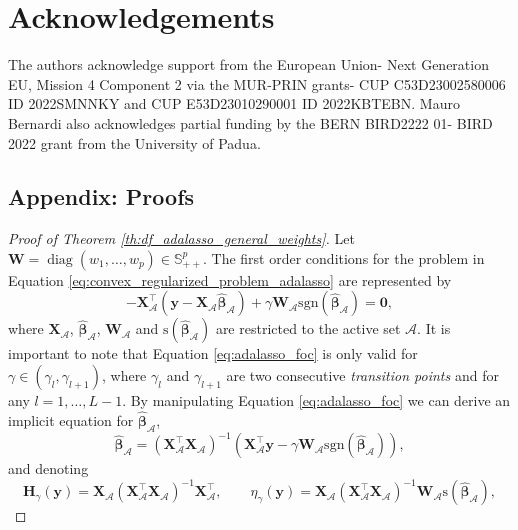 \documentclass[a4paper, 12pt]{article}
\newcommand{\Aset}{\mathcal{A}}
\newcommand{\sgn}{\mathrm{s}}
\DeclareMathOperator{\diag}{diag}
\newcommand{\T}{\top}
\def\bbeta{\boldsymbol{\beta}}
\def\by{\boldsymbol{y}}
\def\bH{\mathbf{H}}
\def\bW{\mathbf{W}}
\def\bX{\mathbf{X}}
\def\by{\mathbf{y}}
\begin{document}
\bigskip 

\section*{Acknowledgements}
The authors acknowledge support from the European Union- Next Generation EU, Mission 4 Component 2 via the MUR-PRIN grants- CUP C53D23002580006 ID 2022SMNNKY and CUP E53D23010290001 ID 2022KBTEBN. Mauro Bernardi also acknowledges partial funding by the BERN BIRD2222 01- BIRD 2022 grant from the University of Padua.

\begin{appendix}
\section*{Appendix: Proofs}
\label{sec:proofs}
%
\begin{proof}[Proof of Theorem \ref{th:df_adalasso_general_weights}]
Let $\bW=\diag(w_1,\dots,w_p)\in\mathbb{S}^p_{++}$. The first order conditions for the problem in Equation \eqref{eq:convex_regularized_problem_adalasso} are represented by
\begin{equation}
\label{eq:adalasso_foc}
-\bX_{\Aset}^{{\T}}(\by-\bX_{\Aset} \widehat{\bbeta}_{\Aset})+\gamma\bW_{\Aset}  \mathrm{sgn}(\widehat{\bbeta}_{\Aset})=\boldsymbol{0},
\end{equation}
where $\bX_{\Aset}$, $\widehat{\bbeta}_{\Aset}$, $\bW_{\Aset}$ and $\sgn{(\widehat{\bbeta}_{\Aset})}$ are restricted to the active set $\Aset$. It is important to note that Equation \eqref{eq:adalasso_foc} is only valid for 
$\gamma \in (\gamma_l, \gamma_{l+1})$, where $\gamma_l$ and $\gamma_{l+1}$ are two consecutive \textit{transition points} and for any $l= 1, \dots,  L-1$.
By manipulating Equation \eqref{eq:adalasso_foc} we can derive an implicit equation for $\widehat{\bbeta}_{\Aset}$,
\begin{equation*}
\widehat{\bbeta}_{\Aset} = (\bX_{\Aset}^{\T} \bX_{\Aset})^{-1}(\bX_{\Aset}^{\T} \by - \gamma \bW_{\Aset} \text{sgn}(\widehat{\bbeta}_{\Aset})),
\end{equation*}
and denoting
\begin{equation*}
\label{eq:dof_adalasso_definitions}
\bH_\gamma(\by)=\bX_{\Aset}(\bX_{\Aset}^{\T}\bX_{\Aset})^{-1} \bX_{\Aset}^{\T}, \quad \quad 
\eta_\gamma(\by)=\bX_{\Aset}(\bX_{\Aset}^{\T}\bX_{\Aset})^{-1}\bW_{\Aset}\sgn(\widehat{\bbeta}_{\Aset}),
\end{equation*}

\end{proof}
\end{appendix}
\end{document}

